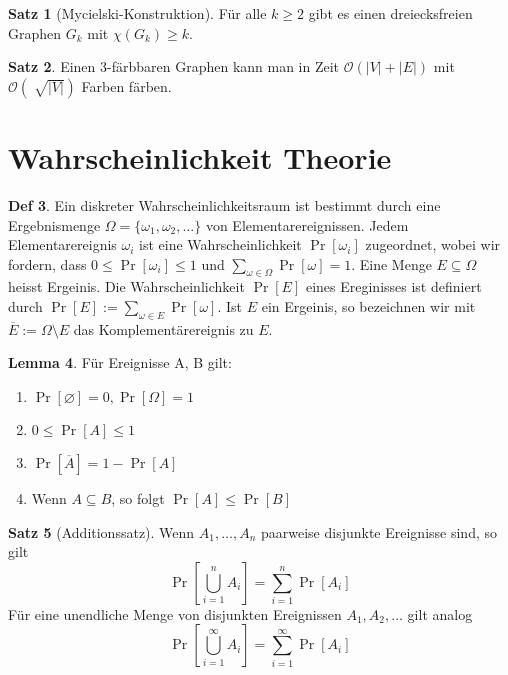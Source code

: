 \documentclass[a4paper, 10pt]{article}
\theoremstyle{definition}
\newtheorem{definition}{Def}[section]
\newtheorem{theorem}[definition]{Satz}
\newtheorem{nlemma}[definition]{Lemma}
\theoremstyle{named}
\newcommand{\BO}{\mathcal{O}}
\begin{document}
\setcounter{definition}{65}
\begin{theorem}[Mycielski-Konstruktion]
    Für alle $k \geq 2$ gibt es einen dreiecksfreien Graphen $G_k$ mit $\chi(G_k) \geq k$.
\end{theorem}

\begin{theorem}
    Einen 3-färbbaren Graphen kann man in Zeit $\BO(|V| + |E|)$ mit $\BO(\sqrt[]{|V|})$ Farben färben.
\end{theorem}

\section{Wahrscheinlichkeit Theorie}
\begin{definition}
    Ein diskreter Wahrscheinlichkeitsraum ist bestimmt durch eine Ergebnismenge $\Omega = \{\omega_1, \omega_2, \ldots\}$ von Elementarereignissen. Jedem Elementarereignis $\omega_i$ ist eine Wahrscheinlichkeit $\Pr[\omega_i]$ zugeordnet, wobei wir fordern, dass $0 \leq \Pr[\omega_i] \leq 1$ und $\sum_{\omega \in \Omega} \Pr[\omega] = 1$.
    Eine Menge $E \subseteq \Omega$ heisst Ergeinis. Die Wahrscheinlichkeit $\Pr[E]$ eines Ereginisses ist definiert durch $\Pr[E] := \sum_{\omega \in E} \Pr[\omega]$.
    Ist $E$ ein Ergeinis, so bezeichnen wir mit $\overline{E} := \Omega \setminus E$ das Komplementärereignis zu $E$.
\end{definition}

\begin{nlemma}
    Für Ereignisse A, B gilt:
    \begin{enumerate}
        \item $\Pr[\varnothing] = 0, \Pr[\Omega] = 1$
        \item $0 \leq \Pr[A] \leq 1$
        \item $\Pr[\overline{A}] = 1 - \Pr[A]$
        \item Wenn $A \subseteq B$, so folgt $\Pr[A] \leq \Pr[B]$
    \end{enumerate}
\end{nlemma}

\begin{theorem}[Additionssatz]
    Wenn $A_1, \ldots , A_n$ paarweise disjunkte Ereignisse sind, so gilt
    $$\Pr\left[\bigcup_{i = 1}^n A_i\right] = \sum_{i=1}^n \Pr[A_i]$$
    Für eine unendliche Menge von disjunkten Ereignissen $A_1, A_2, \ldots$ gilt analog
    $$\Pr\left[\bigcup_{i = 1}^\infty A_i \right] = \sum_{i=1}^\infty \Pr[A_i]$$
\end{theorem}
\end{document}
